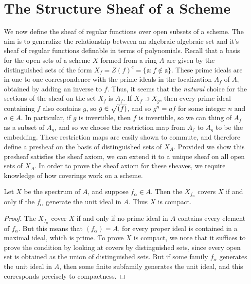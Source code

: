 \section{The Structure Sheaf of a Scheme}

We now define the sheaf of regular functions over open subsets of a scheme. The aim is to generalize the relationship between an algebraic algebraic set and it's sheaf of regular functions definable in terms of polynomials. Recall that a basis for the open sets of a scheme $X$ formed from a ring $A$ are given by the distinguished sets of the form $X_f = Z(f)^c = \{ \mathfrak{a}: f \not \in \mathfrak{a} \}$. These prime ideals are in one to one correspondence with the prime ideals in the localization $A_f$ of $A$, obtained by adding an inverse to $f$. Thus, it seems that the {\it natural} choice for the sections of the sheaf on the set $X_f$ is $A_f$. If $X_f \supset X_g$, then every prime ideal containing $f$ also contains $g$, so $g \in \smash{\sqrt{(f)}}$, and so $g^n = af$ for some integer $n$ and $a \in A$. In particular, if $g$ is invertible, then $f$ is invertible, so we can thing of $A_f$ as a subset of $A_g$, and so we choose the restriction map from $A_f$ to $A_g$ to be the embedding. These restriction maps are easily shown to commute, and therefore define a presheaf on the basis of distinguished sets of $X_A$. Provided we show this presheaf satisfies the sheaf axiom, we can extend it to a unique sheaf on all open sets of $X_A$. In order to prove the sheaf axiom for these sheaves, we require knowledge of how coverings work on a scheme.

\begin{lemma}
    Let $X$ be the spectrum of $A$, and suppose $f_\alpha \in A$. Then the $X_{f_\alpha}$ covers $X$ if and only if the $f_\alpha$ generate the unit ideal in $A$. Thus $X$ is compact.
\end{lemma}
\begin{proof}
    The $X_{f_\alpha}$ cover $X$ if and only if no prime ideal in $A$ contains every element of $f_\alpha$. But this means that $(f_\alpha) = A$, for every proper ideal is contained in a maximal ideal, which is prime. To prove $X$ is compact, we note that it suffices to prove the condition by looking at covers by distinguished sets, since every open set is obtained as the union of distinguished sets. But if some family $f_\alpha$ generates the unit ideal in $A$, then some finite subfamily generates the unit ideal, and this corresponds precisely to compactness.
\end{proof}

